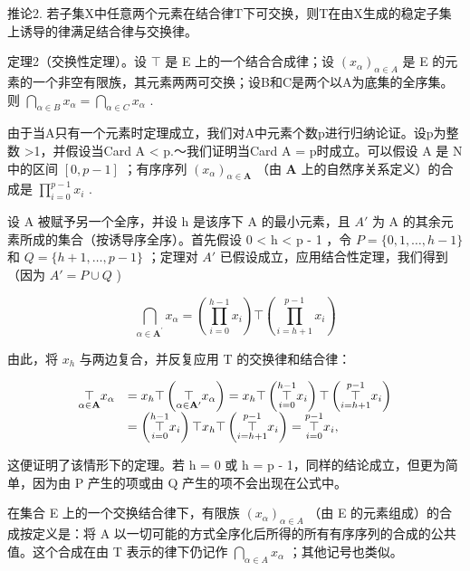 推论2. 若子集X中任意两个元素在结合律T下可交换，则T在由X生成的稳定子集上诱导的律满足结合律与交换律。

定理2（交换性定理）。设 \(\top\) 是 E 上的一个结合合成律；设 \((x_{\alpha})_{\alpha \in A}\) 是 E 的元素的一个非空有限族，其元素两两可交换；设B和C是两个以A为底集的全序集。则 \(\bigcap_{\alpha \in B} x_{\alpha} = \bigcap_{\alpha \in C} x_{\alpha}\) .

由于当A只有一个元素时定理成立，我们对A中元素个数p进行归纳论证。设p为整数 \textgreater1，并假设当Card A \textless{} p.～我们证明当Card A = p时成立。可以假设 A 是 N 中的区间 \([0, p - 1]\) ；有序序列 \((x_{\alpha})_{\alpha \in \mathbf{A}}\) （由 \(\mathbf{A}\) 上的自然序关系定义）的合成是 \(\prod_{i = 0}^{p - 1}x_i\) .

设 A 被赋予另一个全序，并设 h 是该序下 A 的最小元素，且 \(A'\) 为 A 的其余元素所成的集合（按诱导序全序）。首先假设 0 \textless{} h \textless{} p - 1 ，令 \(P = \{0, 1, \ldots, h - 1\}\) 和 \(Q = \{h + 1, \ldots, p - 1\}\) ；定理对 \(A'\) 已假设成立，应用结合性定理，我们得到（因为 \(A' = P \cup Q\) )

\[
\bigcap_ {\alpha \in \mathbf {A} ^ {\prime}} x _ {\alpha} = \left(\prod_ {i = 0} ^ {h - 1} x _ {i}\right) \top \left(\prod_ {i = h + 1} ^ {p - 1} x _ {i}\right)
\]

由此，将 \(x_{h}\) 与两边复合，并反复应用 T 的交换律和结合律：

\[
\begin{array}{r l} \underset {\alpha \in \mathbf {A}} {\top} x _ {\alpha} & = x _ {h} \top \left(\underset {\alpha \in \mathbf {A} ^ {\prime}} {\top} x _ {\alpha}\right) = x _ {h} \top \left(\underset {i = 0} {\overset {h - 1} {\top}} x _ {i}\right) \top \left(\underset {i = h + 1} {\overset {p - 1} {\top}} x _ {i}\right) \\ & = \left(\underset {i = 0} {\overset {h - 1} {\top}} x _ {i}\right) \top x _ {h} \top \left(\underset {i = h + 1} {\overset {p - 1} {\top}} x _ {i}\right) = \underset {i = 0} {\overset {p - 1} {\top}} x _ {i}, \end{array}
\]

这便证明了该情形下的定理。若 h = 0 或 h = p - 1，同样的结论成立，但更为简单，因为由 P 产生的项或由 Q 产生的项不会出现在公式中。

在集合 E 上的一个交换结合律下，有限族 \((x_{\alpha})_{\alpha \in A}\) （由 E 的元素组成）的合成按定义是：将 A 以一切可能的方式全序化后所得的所有有序序列的合成的公共值。这个合成在由 T 表示的律下仍记作 \(\bigcap_{\alpha \in A} x_{\alpha}\) ；其他记号也类似。


